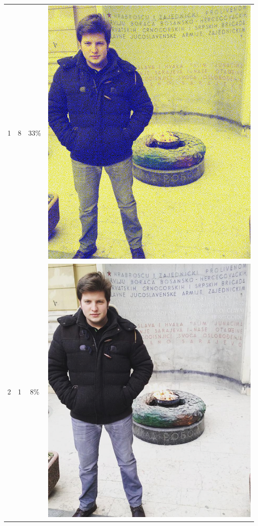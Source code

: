 \documentclass[times, utf8, seminar, numeric]{fer}
\begin{document}
\begin{center}
\begin{longtable}{|c|c|c|c|}
1 & 8 &33\% & \includegraphics[scale=0.3]{../benchmark_results/pattern/1_components-8_bits.png} \\
2 & 1 &8\% & \includegraphics[scale=0.3]{../benchmark_results/pattern/2_components-1_bits.png} \\

\end{longtable}
\end{center}
\end{document}

